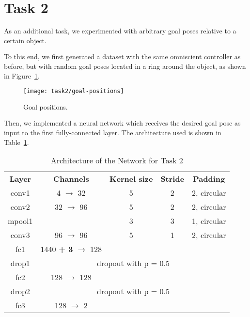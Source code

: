 \section{Task 2}
\label{sec:task2}
As an additional task, we experimented with arbitrary goal poses relative to a 
certain object. 

To this end, we first generated a dataset with the same omniscient controller 
as before, but with random goal poses located in a ring around the object, as 
shown in Figure~\ref{fig:goal-positions}.

\begin{figure}[htbp]
	\centerline{\texttt{[image: task2/goal-positions]}}
	\caption{Goal positions.}
	\label{fig:goal-positions}
\end{figure}

Then, we implemented a neural network which receives the desired goal pose as 
input to the first fully-connected layer. The architecture used is shown in 
Table~\ref{tab: task 2}.

\begin{table}[htbp]
	\caption{Architecture of the Network for Task 2}
	\begin{center}
		\begin{tabular}{|c|c|c|c|c|}
			\hline
			\textbf{Layer}&\textbf{Channels} &\textbf{Kernel size} 
			&\textbf{Stride} &\textbf{Padding}\\
			\cline{1-5}
			conv1  &  4 $\rightarrow$ 	32 & 5 & 2 & 2, circular \\ \hline
			conv2  & 32 $\rightarrow$  	96 & 5 & 2 & 2, circular \\ \hline
			mpool1 & 					   & 3	& 3 & 1, circular \\ 
			\hline			
			conv3  & 96 $\rightarrow$  	96 & 5 & 1 & 2, circular \\ \hline
			fc1   &  1440 \textbf{+ 3} $\rightarrow$ 128 &  &  &  \\ \hline
			drop1 & \multicolumn{4}{c|}{dropout with p = 0.5} \\ \hline
			fc2   &  128 $\rightarrow$ 128 &  &  &  \\ \hline
			 drop2 & \multicolumn{4}{c|}{ dropout with p = 0.5} \\ \hline
			fc3 &  128 $\rightarrow$   2 &  &  &  \\ \hline
		\end{tabular}
		\label{tab: task 2}
	\end{center}
\end{table}

